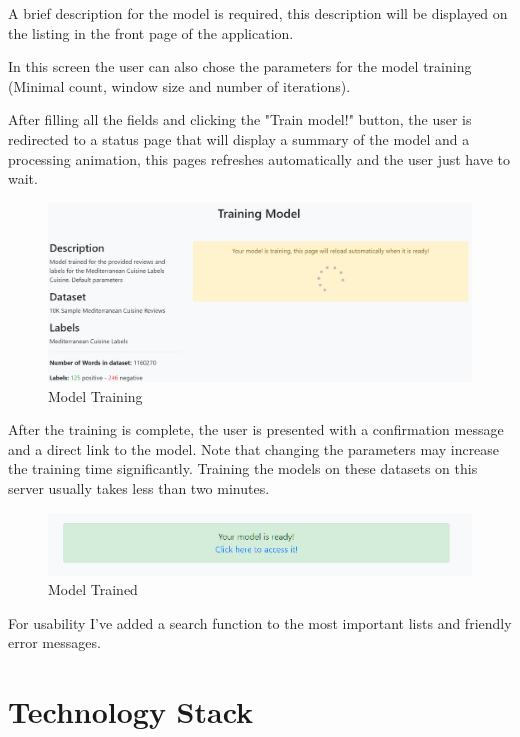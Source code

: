 \documentclass[table,xcdraw]{article}
\begin{document}
A brief description for the model is required, this description will be displayed on the listing in the front page of the application.

In this screen the user can also chose the parameters for the model training (Minimal count, window size and number of iterations).

After filling all the fields and clicking the "Train model!" button, the user is redirected to a status page that will display a summary of the model and a processing animation, this pages refreshes automatically and the user just have to wait.

\begin{figure}[H]
	\centering
	\includegraphics[width=\linewidth]{screen_model_training}
	\caption{Model Training}
	\label{fig:screen_model_training}
	\end{figure}

After the training is complete, the user is presented with a confirmation message and a direct link to the model. Note that changing the parameters may increase the training time significantly. Training the models on these datasets on this server usually takes less than two minutes.


\begin{figure}[H]
	\centering
	\includegraphics[width=\linewidth]{screen_trainin_done}
	\caption{Model Trained}
	\label{fig:screen_trainin_done}
	\end{figure}

For usability I've added a search function to the most important lists and friendly error messages.

\section{Technology Stack}
\end{document}
